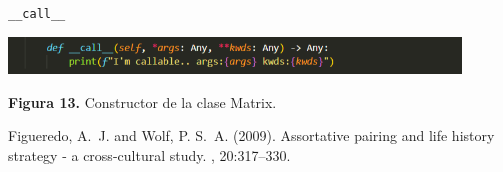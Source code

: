 \documentclass[10pt]{article} %
\newcommand{\imgcaption}[2]{\tiny \textbf{Figura #1.} #2.}
\newcommand{\mgc}[2][]{\colorbox{backcolour}{\texttt{\_\_#2\_\_#1}}}
\begin{document}
\colorbox{backcolour}{\mgc{call}}

\begin{center}
	\includegraphics[width=12cm]{call.png}
	
	\imgcaption{13}{Constructor de la clase Matrix}
\end{center}


\begin{thebibliography}{99} %

Figueredo, A.~J. and Wolf, P. S.~A. (2009).
\newblock Assortative pairing and life history strategy - a cross-cultural
  study.
, 20:317--330.
 
\end{thebibliography}

\end{document}
